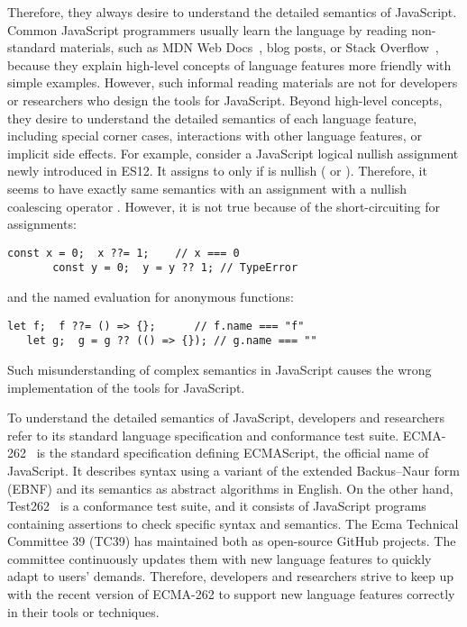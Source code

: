 Therefore, they always desire to understand the detailed semantics of
JavaScript.  Common JavaScript programmers usually learn the language by reading
non-standard materials, such as MDN Web Docs~\cite{mdn-doc}, blog posts, or
Stack Overflow~\cite{stackoverflow}, because they explain high-level concepts of
language features more friendly with simple examples.  However, such informal
reading materials are not for developers or researchers who design the tools for
JavaScript.  Beyond high-level concepts, they desire to understand the detailed
semantics of each language feature, including special corner cases, interactions
with other language features, or implicit side effects.  For example, consider a
JavaScript logical nullish assignment  newly introduced in ES12.
It assigns  to  only if  is nullish
( or ). Therefore, it seems to have exactly same
semantics with an assignment  with a nullish coalescing
operator .  However, it is not true because of the short-circuiting
for assignments:
\begin{lstlisting}[style=JS]
       const x = 0;  x ??= 1;    // x === 0
       const y = 0;  y = y ?? 1; // TypeError
\end{lstlisting}
and the named evaluation for anonymous functions:
\begin{lstlisting}[style=JS]
   let f;  f ??= () => {};      // f.name === "f"
   let g;  g = g ?? (() => {}); // g.name === ""
\end{lstlisting}
Such misunderstanding of complex semantics in JavaScript causes the wrong
implementation of the tools for JavaScript.

To understand the detailed semantics of JavaScript, developers and researchers
refer to its standard language specification and conformance test suite.
ECMA-262~\cite{es12} is the standard specification defining ECMAScript, the
official name of JavaScript.  It describes syntax using a variant of the
extended Backus–Naur form (EBNF) and its semantics as abstract algorithms in
English.  On the other hand, Test262~\cite{test262} is a conformance test suite,
and it consists of JavaScript programs containing assertions to check specific
syntax and semantics.  The Ecma Technical Committee 39 (TC39) has maintained
both as open-source GitHub projects.  The committee continuously updates them
with new language features to quickly adapt to users' demands.  Therefore,
developers and researchers strive to keep up with the recent version of ECMA-262
to support new language features correctly in their tools or techniques.

